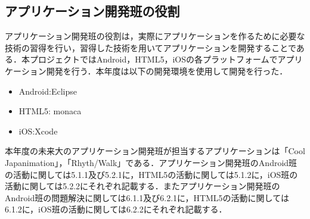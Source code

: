 \subsection{アプリケーション開発班の役割}
\par
アプリケーション開発班の役割は，実際にアプリケーションを作るために必要な技術の習得を行い，習得した技術を用いてアプリケーションを開発することである．本プロジェクトではAndroid，HTML5，iOSの各プラットフォームでアプリケーション開発を行う．本年度は以下の開発環境を使用して開発を行った．

\begin{itemize}
\item Android:Eclipse
\item HTML5: monaca
\item iOS:Xcode
\end{itemize}

\par 本年度の未来大のアプリケーション開発班が担当するアプリケーションは「Cool Japanimation」，「Rhyth/Walk」である．アプリケーション開発班のAndroid班の活動に関しては5.1.1及び5.2.1に，HTML5の活動に関しては5.1.2に，iOS班の活動に関しては5.2.2にそれぞれ記載する．またアプリケーション開発班のAndroid班の問題解決に関しては6.1.1及び6.2.1に，HTML5の活動に関しては6.1.2に，iOS班の活動に関しては6.2.2にそれぞれ記載する．

